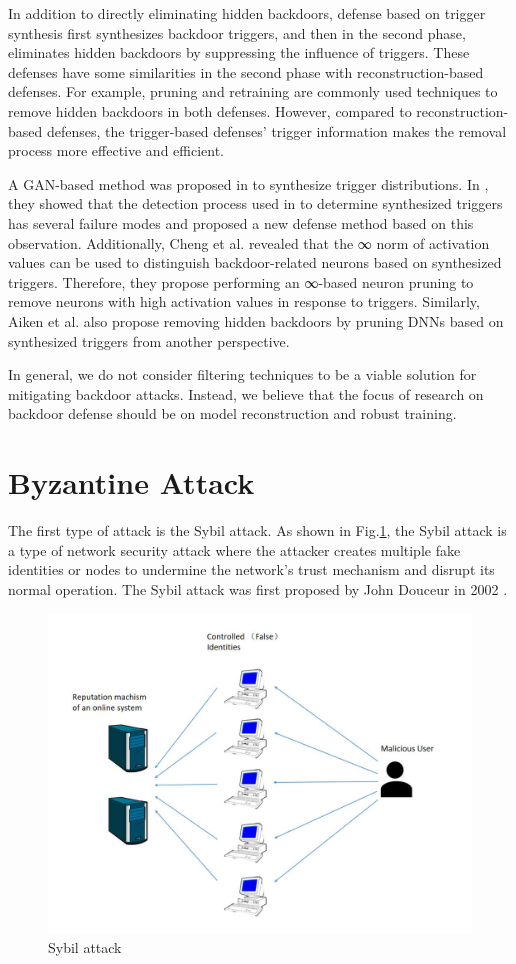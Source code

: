 \documentclass[conference]{IEEEtran}
\begin{document}
In addition to directly eliminating hidden backdoors, defense based on trigger synthesis first
synthesizes backdoor triggers, and then in the second phase, eliminates hidden backdoors by suppressing the influence of triggers.
These defenses have some similarities in the second phase with reconstruction-based defenses. For example,
pruning and retraining are commonly used techniques to remove hidden backdoors in both defenses. However,
compared to reconstruction-based defenses, the trigger-based defenses' trigger information makes the removal process more effective and efficient.

A GAN-based method was proposed in \cite{b93} to synthesize trigger distributions.
In \cite{b94}, they showed that the detection process used in \cite{b95} to determine synthesized
triggers has several failure modes and proposed a new defense method based on this observation.
Additionally, Cheng et al. \cite{b96} revealed that the ∞ norm of activation values can be used to
distinguish backdoor-related neurons based on synthesized triggers. Therefore, they propose performing an
∞-based neuron pruning to remove neurons with high activation values in response to triggers.
Similarly, Aiken et al.\cite{b97} also propose removing hidden backdoors
by pruning DNNs based on synthesized triggers from another perspective.

In general, we do not consider filtering techniques to be a viable solution for mitigating backdoor attacks.
Instead, we believe that the focus of research on backdoor defense should be on model reconstruction and robust training.

\section{Byzantine Attack}
The first type of attack is the Sybil attack.  As shown in Fig.\ref{fig12}, the Sybil attack is a type of network security attack where the attacker creates
multiple fake identities or nodes to undermine the network's trust mechanism and disrupt its normal operation.
The Sybil attack was first proposed by John Douceur in 2002 \cite{b110}.

\begin{figure}[htbp]
    \centerline{\includegraphics[width=0.8\linewidth,height=0.6\linewidth]{picture/sybil.jpg}}
    \caption{Sybil attack}
    \label{fig12}
\end{figure}
\end{document}
